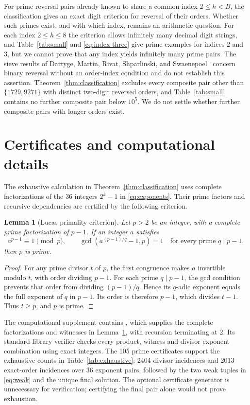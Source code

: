 \documentclass[11pt]{amsart}
\newtheorem{lemma}[theorem]{Lemma}
\theoremstyle{remark}\newtheorem{remark}[theorem]{Remark}
\begin{document}
For prime reversal pairs already known to share a common index $2\le h<B$, the classification gives an exact digit criterion for reversal of their orders. Whether such primes exist, and with which index, remains an arithmetic question. For each index $2\le h\le8$ the criterion allows infinitely many decimal digit strings, and Table~\ref{tab:small} and \eqref{eq:index-three} give prime examples for indices $2$ and $3$, but we cannot prove that any index yields infinitely many prime pairs. The sieve results of Dartyge, Martin, Rivat, Shparlinski, and Swaenepoel~\cite{Dartyge2024} concern binary reversal without an order-index condition and do not establish this assertion. Theorem~\ref{thm:classification} excludes every composite pair other than $\{1729,9271\}$ with distinct two-digit reversed orders, and Table~\ref{tab:small} contains no further composite pair below $10^5$. We do not settle whether further composite pairs with longer orders exist.

\appendix
\section{Certificates and computational details}\label{sec:reproduction}

The exhaustive calculation in Theorem~\ref{thm:classification} uses complete factorizations of the 36 integers $2^k-1$ in \eqref{eq:exponents}. Their prime factors and recursive dependencies are certified by the following criterion.

\begin{lemma}[Lucas primality criterion]\label{lem:lucas}
Let $p>2$ be an integer, with a complete prime factorization of $p-1$. If an integer $a$ satisfies
\begin{equation}\label{eq:lucas}
 a^{p-1}\equiv1\pmod p,\qquad
 \gcd(a^{(p-1)/q}-1,p)=1
 \quad\text{for every prime }q\mid p-1,
\end{equation}
then $p$ is prime.
\end{lemma}
\begin{proof}
For any prime divisor $t$ of $p$, the first congruence makes $a$ invertible modulo $t$, with order dividing $p-1$. For each prime $q\mid p-1$, the gcd condition prevents that order from dividing $(p-1)/q$. Hence its $q$-adic exponent equals the full exponent of $q$ in $p-1$. Its order is therefore $p-1$, which divides $t-1$. Thus $t\ge p$, and $p$ is prime.
\end{proof}

The computational supplement contains , which supplies the complete factorizations and witnesses in Lemma~\ref{lem:lucas}, with recursion terminating at 2. Its standard-library verifier  checks every product, witness and divisor exponent combination using exact integers. The 105 prime certificates support the exhaustive counts in Table~\ref{tab:exhaustive}: 2404 divisor incidences and 2013 exact-order incidences over 36 exponent pairs, followed by the two weak tuples in \eqref{eq:weak} and the unique final solution. The optional certificate generator is unnecessary for verification; certifying the final pair alone would not prove exhaustion.
\end{document}
